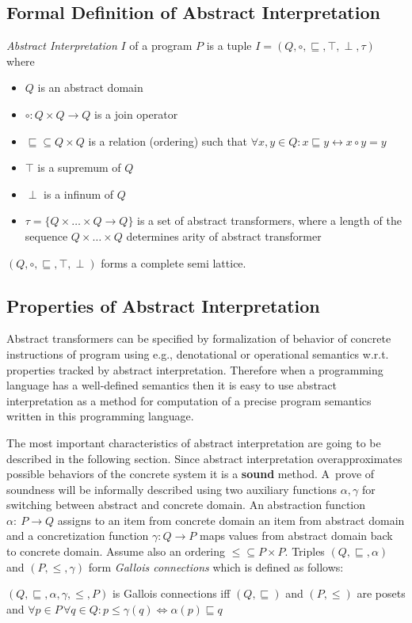 \documentclass[a4paper, 12pt]{article}
\newcommand{\aord}[0]{\sqsubseteq}
\newcommand{\cord}[0]{\leq}
\newcommand{\adom}[0]{Q}
\newcommand{\aitem}[0]{q}
\newcommand{\asup}[0]{\top}
\newcommand{\ainf}[0]{\perp}
\newcommand{\cdom}[0]{P}
\newcommand{\citem}[0]{p}
\newcommand{\atrans}[0]{\tau}
\newcommand{\ajoin}[0]{\circ}
\newcommand{\afun}[0]{\alpha}
\newcommand{\cfun}[0]{\gamma}
\begin{document}
\subsection{Formal Definition of Abstract Interpretation}
\emph{Abstract Interpretation} $I$ of a program $P$ is a tuple
$I=(\adom, \ajoin, \aord, \asup, \ainf, \atrans)$ where
\begin{itemize}
	\item $\adom$ is an abstract domain
	\item $\ajoin: \adom \times \adom \rightarrow \adom$ is a join operator
	\item $\aord \subseteq \adom \times \adom$ is a relation (ordering) such that $\forall x,y \in \adom: x \aord y \leftrightarrow x \ajoin y = y$
	\item $\asup$ is a supremum of $\adom$
	\item $\ainf$ is a infinum of $\adom$
	\item $\atrans = \{\adom \times \ldots \times \adom \rightarrow \adom\}$ is a set of abstract transformers, where a length of
		the sequence $\adom \times \ldots \times \adom$ determines arity of abstract transformer
\end{itemize}


$(\adom, \ajoin, \aord, \top, \perp)$ forms a complete semi lattice.

\subsection{Properties of Abstract Interpretation}

Abstract transformers can be specified by formalization of behavior of concrete instructions
of program using e.g., denotational or operational semantics w.r.t. properties tracked
by abstract interpretation.
Therefore when a programming language has a well-defined semantics then
it is easy to use abstract interpretation as a method for computation
of a precise program semantics written in this programming language.

The most important characteristics of abstract interpretation
are going to be described in the following section.
Since abstract interpretation overapproximates possible behaviors of
the concrete system it is a \textbf{sound} method.
A~prove of soundness will be informally described using
two auxiliary functions $\afun, \cfun$ for switching between abstract and concrete domain.
An abstraction function $\afun:~\cdom \rightarrow \adom$ assigns to an item from
concrete domain an item from abstract domain and a concretization function
$\cfun: \adom \rightarrow \cdom$ maps values from abstract domain back to concrete domain.
Assume also an ordering $\cord \subseteq \cdom \times \cdom$.
Triples $(\adom, \aord, \afun)$ and $(\cdom, \cord, \cfun)$ form
\emph{Gallois connections} \cite{popl77} which is defined as follows:
\begin{center}
	$(\adom, \aord, \afun, \cfun, \cord, \cdom)$ is Gallois connections iff
	$(\adom, \aord)$ and $(\cdom, \cord)$ are posets and
	$\forall \citem \in \cdom \, \forall \aitem \in \adom: \citem \cord \cfun(\aitem)
	\Leftrightarrow \afun(\citem) \aord \aitem$
\end{center}
\end{document}
